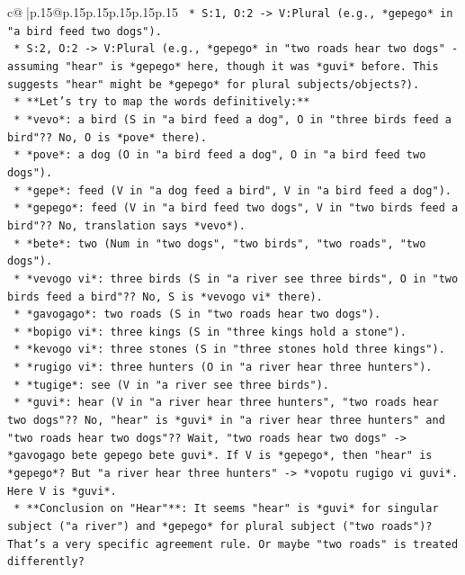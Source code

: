 \documentclass{article}
\begin{document}
{\begin{supertabular}{c@{$\;$}|p{.15\linewidth}@{}p{.15\linewidth}p{.15\linewidth}p{.15\linewidth}p{.15\linewidth}p{.15\linewidth}}
{{{\texttt{                *   S:1, O:2 {-}> V:Plural (e.g., *gepego* in "a bird feed two dogs").} \\
\texttt{                *   S:2, O:2 {-}> V:Plural (e.g., *gepego* in "two roads hear two dogs" {-} assuming "hear" is *gepego* here, though it was *guvi* before. This suggests "hear" might be *gepego* for plural subjects/objects?).} \\
\texttt{            *   **Let's try to map the words definitively:**} \\
\texttt{                *   *vevo*: a bird (S in "a bird feed a dog", O in "three birds feed a bird"?? No, O is *pove* there).} \\
\texttt{                *   *pove*: a dog (O in "a bird feed a dog", O in "a bird feed two dogs").} \\
\texttt{                *   *gepe*: feed (V in "a dog feed a bird", V in "a bird feed a dog").} \\
\texttt{                *   *gepego*: feed (V in "a bird feed two dogs", V in "two birds feed a bird"?? No, translation says *vevo*).} \\
\texttt{                *   *bete*: two (Num in "two dogs", "two birds", "two roads", "two dogs").} \\
\texttt{                *   *vevogo vi*: three birds (S in "a river see three birds", O in "two birds feed a bird"?? No, S is *vevogo vi* there).} \\
\texttt{                *   *gavogago*: two roads (S in "two roads hear two dogs").} \\
\texttt{                *   *bopigo vi*: three kings (S in "three kings hold a stone").} \\
\texttt{                *   *kevogo vi*: three stones (S in "three stones hold three kings").} \\
\texttt{                *   *rugigo vi*: three hunters (O in "a river hear three hunters").} \\
\texttt{                *   *tugige*: see (V in "a river see three birds").} \\
\texttt{                *   *guvi*: hear (V in "a river hear three hunters", "two roads hear two dogs"?? No, "hear" is *guvi* in "a river hear three hunters" and "two roads hear two dogs"?? Wait, "two roads hear two dogs" {-}> *gavogago bete gepego bete guvi*. If V is *gepego*, then "hear" is *gepego*? But "a river hear three hunters" {-}> *vopotu rugigo vi guvi*. Here V is *guvi*.} \\
\texttt{                *   **Conclusion on "Hear"**: It seems "hear" is *guvi* for singular subject ("a river") and *gepego* for plural subject ("two roads")? That's a very specific agreement rule. Or maybe "two roads" is treated differently?} \\
}}}
\end{supertabular}}
\end{document}
